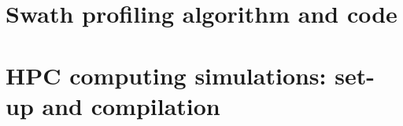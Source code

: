 \chapter{Swath profiling algorithm and code}




\chapter{HPC computing simulations: set-up and compilation}

